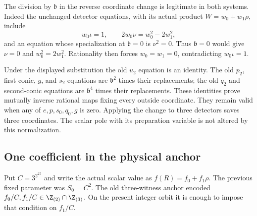 The division by $\mathfrak b$ in the reverse coordinate change is
legitimate in both systems.  Indeed the unchanged detector equations,
with its actual product $W=w_0+w_1\rho$, include
\[
 w_0\iota=1,\qquad
 2w_0\nu=w_0^2-2w_1^2,
\]
and an equation whose specialization at $\mathfrak b=0$ is $\nu^2=0$.
Thus $\mathfrak b=0$ would give $\nu=0$ and $w_0^2=2w_1^2$.
Rationality then forces $w_0=w_1=0$, contradicting $w_0\iota=1$.

Under the displayed substitution the old $u_2$ equation is an identity.
The old $p_2$, first-conic, $g$, and $s_2$ equations are
$\mathfrak b^2$ times their replacements; the old $q_2$ and second-conic
equations are $\mathfrak b^4$ times their replacements.  These identities
prove mutually inverse rational maps fixing every outside coordinate.
They remain valid when any of $e,p,s_0,q_0,g$ is zero.  Applying the
change to three detectors saves three coordinates.  The scalar pole
with its preparation variable is not altered by this normalization.

\subsection{One coefficient in the physical anchor}\label{subsec:v12-anchor}

Put $C=3^{2^{25}}$ and write the actual scalar value as
$f(R)=f_0+f_1\rho$.  The previous fixed parameter was $S_0=C^2$.
The old three-witness anchor encoded
$f_0/C,f_1/C\in\Z_{(2)}\cap\Z_{(3)}$.  On the present integer orbit it
is enough to impose that condition on $f_1/C$.

